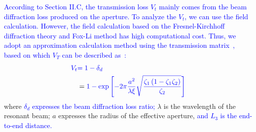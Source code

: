 \documentclass{IEEEtran}
\begin{document}
\textcolor{blue}{According to Section II.C, the transmission loss $V_t$ mainly comes from the beam diffraction loss produced on the aperture. To analyze the $V_t$, we can use the field calculation. However, the field calculation based on the Fresnel-Kirchhoff diffraction theory and Fox-Li method has high computational cost. 
Thus, we adopt an approximation calculation method using the transmission matrix~\cite{cao2018analysis}, based on which $V_T$ can be described as~:}
\begin{equation}\label{dloss0}
\begin{aligned}
\textcolor{blue}{V_t} &\textcolor{blue}{=1-\delta_d}\\
&= \textcolor{blue}{1-\exp \left[-2 \pi \frac{a^2}{\lambda \xi} \sqrt{\frac{\zeta_1\left(1-\zeta_1 \zeta_2\right)}{\zeta_2}}\right]}
\end{aligned}
\end{equation}
where \textcolor{blue}{$\delta_d$ expresses the beam diffraction loss ratio;} $\lambda$ is the wavelength of the resonant beam; $a$ expresses the radius of the effective aperture, 
\textcolor{blue}{and $L_3$ is the end-to-end distance.} 
\end{document}
